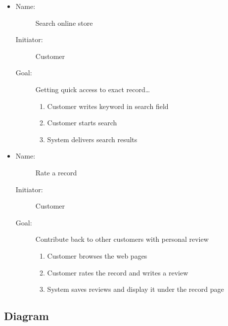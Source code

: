 \documentclass[12pt, titlepage]{article}
\begin{document}
\begin{description}
\begin{itemize}
    \item 
        \begin{description}
            \item[Name:]Search online store
		    \item[Initiator:]Customer
		    \item[Goal:]Getting quick access to exact record\dots
		    \begin{enumerate}
		    	\item Customer writes keyword in search field
			\item Customer starts search
			\item System delivers search results
		    \end{enumerate}
        \end{description}
    \item 
        \begin{description}
		\item[Name:]Rate a record 
		\item[Initiator:]Customer 
		\item[Goal:]Contribute back to other customers with personal review 
			\begin{enumerate}
			\item Customer browses the web pages
			\item Customer rates the record and writes a review
			\item System saves reviews and display it under the record page
			\end{enumerate}
        \end{description}
    \end{itemize}
\end{description}

\subsection{Diagram}
\begin{center}
\end{center}
\end{document}
